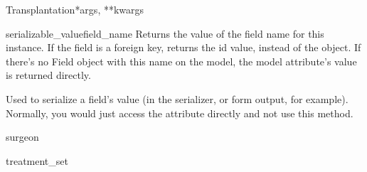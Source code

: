 \documentclass[letterpaper,10pt,english]{sphinxmanual}
\begin{document}
\begin{classdesc}{Transplantation}{*args, **kwargs}
\hypertarget{data.models.Transplantation.serializable_value}{}\begin{methoddesc}[Transplantation]{serializable\_value}{field\_name}
Returns the value of the field name for this instance. If the field is
a foreign key, returns the id value, instead of the object. If there's
no Field object with this name on the model, the model attribute's
value is returned directly.

Used to serialize a field's value (in the serializer, or form output,
for example). Normally, you would just access the attribute directly
and not use this method.
\end{methoddesc}

\hypertarget{data.models.Transplantation.surgeon}{}\begin{memberdesc}[Transplantation]{surgeon}\end{memberdesc}

\hypertarget{data.models.Transplantation.treatment_set}{}\begin{memberdesc}[Transplantation]{treatment\_set}\end{memberdesc}
\end{classdesc}
\end{document}
